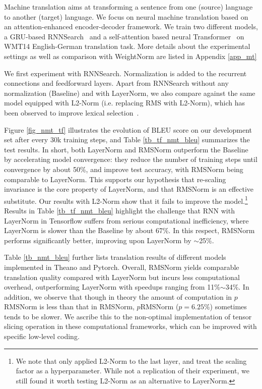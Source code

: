 Machine translation aims at transforming a sentence from one (source) language to another (target) language. We focus on neural machine translation based on an attention-enhanced encoder-decoder framework. We train two different models, a GRU-based RNNSearch~\cite{bahdanau+al-2014-nmt} and a self-attention based neural Transformer~\cite{NIPS2017_7181} on WMT14 English-German translation task. More details about the experimental settings as well as comparison with WeightNorm are listed in Appendix \ref{app_mt}

We first experiment with RNNSearch. Normalization is added to the recurrent connections and feedforward layers. Apart from RNNSearch without any normalization (Baseline) and with LayerNorm, we also compare against the same model equipped with L2-Norm (i.e. replacing RMS with L2-Norm), which has been observed to improve lexical selection~\cite{nguyen2017improving}. 

Figure \ref{fig_nmt_tf} illustrates the evolution of BLEU score on our development set after every 30k training steps, and Table \ref{tb_tf_nmt_bleu} summarizes the test results. In short, both LayerNorm and RMSNorm outperform the Baseline by accelerating model convergence: they reduce the number of training steps until convergence by about 50\%, and improve test accuracy, with RMSNorm being comparable to LayerNorm. This supports our hypothesis that re-scaling invariance is the core property of LayerNorm, and that RMSNorm is an effective substitute. Our results with L2-Norm show that it fails to improve the model.\footnote{We note that \citet{nguyen2017improving} only applied L2-Norm to the last layer, and treat the scaling factor as a hyperparameter. While not a replication of their experiment, we still found it worth testing L2-Norm as an alternative to LayerNorm.} Results in Table \ref{tb_tf_nmt_bleu} highlight the challenge that RNN with LayerNorm in Tensorflow suffers from serious computational inefficiency, where LayerNorm is slower than the Baseline by about 67\%. In this respect, RMSNorm performs significantly better, improving upon LayerNorm by $\sim$25\%. 

Table \ref{tb_nmt_bleu} further lists translation results of different models implemented in Theano and Pytorch. Overall, RMSNorm yields comparable translation quality compared with LayerNorm but incurs less computational overhead, outperforming LayerNorm with speedups ranging from 11\%$\sim$34\%. In addition, we observe that though in theory the amount of computation in $p$RMSNorm is less than that in RMSNorm, $p$RMSNorm ($p=6.25\%$) sometimes tends to be slower. We ascribe this to the non-optimal implementation of tensor slicing operation in these computational frameworks, which can be improved with specific low-level coding.

